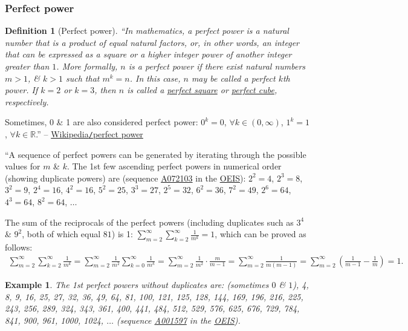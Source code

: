\documentclass{article}
\newtheorem{definition}{Definition}
\newtheorem{example}{Example}
\begin{document}
\subsubsection{Perfect power}

\begin{definition}[Perfect power]
	``In mathematics, a \emph{perfect power} is a natural number that is a product of equal natural factors, or, in other words, an integer that can be expressed as a square or a higher integer power of another integer greater than $1$. More formally, $n$ is a \emph{perfect power} if there exist natural numbers $m > 1$, \& $k > 1$ such that $m^k = n$. In this case, $n$ may be called a \emph{perfect $k$th power}. If $k = 2$ or $k = 3$, then $n$ is called a \href{https://en.wikipedia.org/wiki/Square_number}{perfect square} or \href{https://en.wikipedia.org/wiki/Perfect_cube}{perfect cube}, respectively.
\end{definition}
Sometimes, 0 \& 1 are also considered perfect power: $0^k = 0$, $\forall k\in(0,\infty)$, $1^k = 1$, $\forall k\in\mathbb{R}$.'' -- \href{https://en.wikipedia.org/wiki/Perfect_power}{Wikipedia{\tt/}perfect power}

``A sequence of perfect powers can be generated by iterating through the possible values for $m$ \& $k$. The 1st few ascending perfect powers in numerical order (showing duplicate powers) are (sequence \href{https://oeis.org/A072103}{A072103} in the \href{https://en.wikipedia.org/wiki/On-Line_Encyclopedia_of_Integer_Sequences}{OEIS}): $2^2 = 4$, $2^3 = 8$, $3^2 = 9$, $2^4 = 16$, $4^2 = 16$, $5^2 = 25$, $3^3 = 27$, $2^5 = 32$, $6^2 = 36$, $7^2 = 49$, $2^6 = 64$, $4^3 = 64$, $8^2 = 64$, $\ldots$

The sum of the reciprocals of the perfect powers (including duplicates such as $3^4$ \& $9^2$, both of which equal $81$) is 1: $\sum_{m=2}^\infty\sum_{k=2}^\infty \frac{1}{m^k} = 1$, which can be proved as follows:
\begin{align*}
	\sum_{m=2}^\infty\sum_{k=2}^\infty \frac{1}{m^k} = \sum_{m=2}^\infty \frac{1}{m^2}\sum_{k=0}^\infty \frac{1}{m^k} = \sum_{m=2}^\infty \frac{1}{m^2}\cdot\frac{m}{m - 1} = \sum_{m=2}^\infty \frac{1}{m(m - 1)} = \sum_{m=2}^\infty \left(\frac{1}{m - 1} - \frac{1}{m}\right) = 1.
\end{align*}

\begin{example}
	The 1st perfect powers without duplicates are: (sometimes $0$ \& $1$), \emph{4, 8, 9, 16, 25, 27, 32, 36, 49, 64, 81, 100, 121, 125, 128, 144, 169, 196, 216, 225, 243, 256, 289, 324, 343, 361, 400, 441, 484, 512, 529, 576, 625, 676, 729, 784, 841, 900, 961, 1000, 1024}, $\ldots$ (sequence \href{https://oeis.org/A001597}{A001597} in the \href{https://en.wikipedia.org/wiki/On-Line_Encyclopedia_of_Integer_Sequences}{OEIS}).
\end{example}
\end{document}
